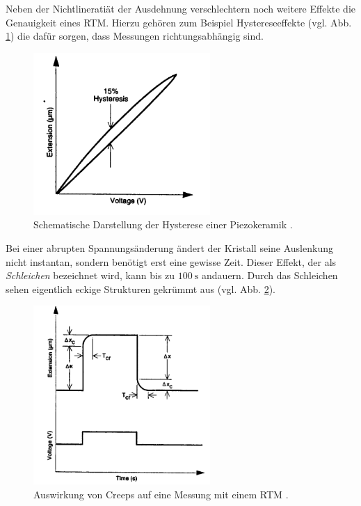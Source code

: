 Neben der Nichtlineratiät der Ausdehnung verschlechtern noch weitere %
Effekte die Genauigkeit eines RTM. Hierzu gehören zum Beispiel Hystereseeffekte (vgl. Abb. \ref{fig: hysterese}) die dafür sorgen,
dass Messungen richtungsabhängig sind.
\begin{figure}[!h]
  \centering
  \includegraphics[width=0.6\textwidth]{./pics/hysterese.png}
  \caption{Schematische Darstellung der Hysterese einer Piezokeramik \cite{rtm}.}
  \label{fig: hysterese}
\end{figure}
Bei einer abrupten Spannungsänderung ändert der Kristall seine Auslenkung nicht instantan, sondern benötigt erst eine gewisse Zeit.
Dieser Effekt, der als \emph{Schleichen} bezeichnet wird, kann bis zu $\SI{100}{\second}$ andauern.
Durch das Schleichen sehen eigentlich eckige Strukturen gekrümmt aus (vgl. Abb. \ref{fig: creep}).
\begin{figure}[!h]
  \centering
  \includegraphics[width=0.6\textwidth]{./pics/creep.png}
  \caption{Auswirkung von Creeps auf eine Messung mit einem RTM \cite{rtm}.}
  \label{fig: creep}
\end{figure}
